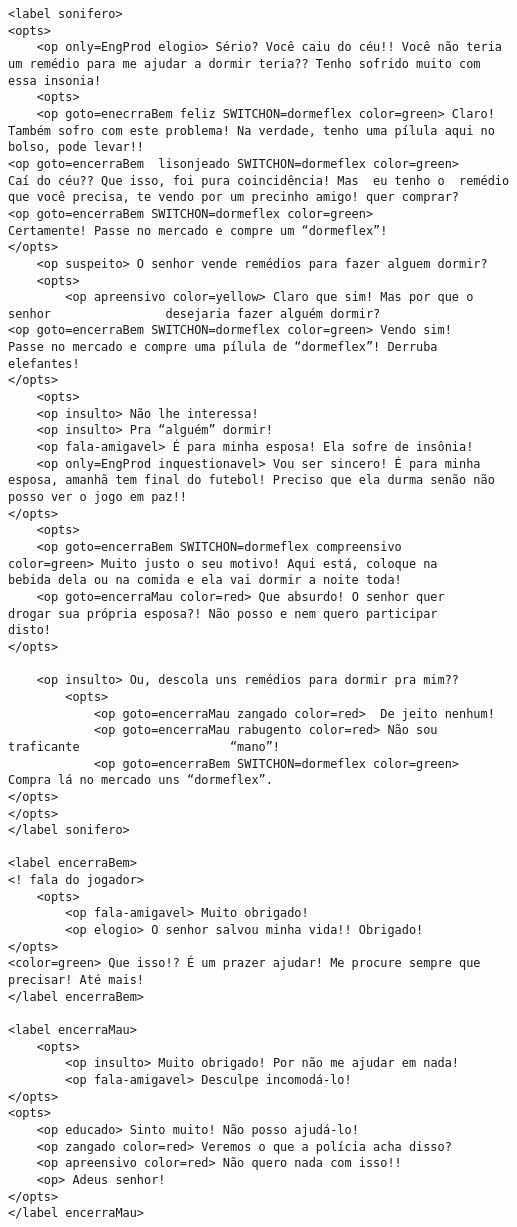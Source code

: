 {\begin{verbatim}
<label sonifero>
<opts>
	<op only=EngProd elogio> Sério? Você caiu do céu!! Você não teria um remédio para me ajudar a dormir teria?? Tenho sofrido muito com essa insonia!
	<opts>
	<op goto=enecrraBem feliz SWITCHON=dormeflex color=green> Claro! 			Também sofro com este problema! Na verdade, tenho uma pílula aqui no 			bolso, pode levar!!
<op goto=encerraBem  lisonjeado SWITCHON=dormeflex color=green> 		Caí do céu?? Que isso, foi pura coincidência! Mas  eu tenho o  remédio 		que você precisa, te vendo por um precinho amigo! quer comprar?
<op goto=encerraBem SWITCHON=dormeflex color=green> 			Certamente! Passe no mercado e compre um “dormeflex”!
</opts>
	<op suspeito> O senhor vende remédios para fazer alguem dormir?
	<opts>
		<op apreensivo color=yellow> Claro que sim! Mas por que o senhor 				desejaria fazer alguém dormir?
<op goto=encerraBem SWITCHON=dormeflex color=green> Vendo sim! 		Passe no mercado e compre uma pílula de “dormeflex”! Derruba 			elefantes!
</opts>
	<opts>
	<op insulto> Não lhe interessa!
	<op insulto> Pra “alguém” dormir!
	<op fala-amigavel> É para minha esposa! Ela sofre de insônia!
	<op only=EngProd inquestionavel> Vou ser sincero! É para minha esposa, amanhã tem final do futebol! Preciso que ela durma senão não posso ver o jogo em paz!!
</opts>
	<opts>
	<op goto=encerraBem SWITCHON=dormeflex compreensivo 			color=green> Muito justo o seu motivo! Aqui está, coloque na 			bebida dela ou na comida e ela vai dormir a noite toda!
	<op goto=encerraMau color=red> Que absurdo! O senhor quer 			drogar sua própria esposa?! Não posso e nem quero participar 			disto!
</opts>
	
	<op insulto> Ou, descola uns remédios para dormir pra mim??
		<opts>
			<op goto=encerraMau zangado color=red>  De jeito nenhum!
			<op goto=encerraMau rabugento color=red> Não sou traficante 					“mano”!
			<op goto=encerraBem SWITCHON=dormeflex color=green> 					Compra lá no mercado uns “dormeflex”.
</opts>
</opts>
</label sonifero>

<label encerraBem>
<! fala do jogador>
	<opts>
		<op fala-amigavel> Muito obrigado!
		<op elogio> O senhor salvou minha vida!! Obrigado!
</opts>
<color=green> Que isso!? É um prazer ajudar! Me procure sempre que precisar! Até mais!
</label encerraBem>

<label encerraMau>
	<opts>
		<op insulto> Muito obrigado! Por não me ajudar em nada!
		<op fala-amigavel> Desculpe incomodá-lo!
</opts>
<opts>
	<op educado> Sinto muito! Não posso ajudá-lo!
	<op zangado color=red> Veremos o que a polícia acha disso?
	<op apreensivo color=red> Não quero nada com isso!!
	<op> Adeus senhor!
</opts>
</label encerraMau>
\end{verbatim}
}
